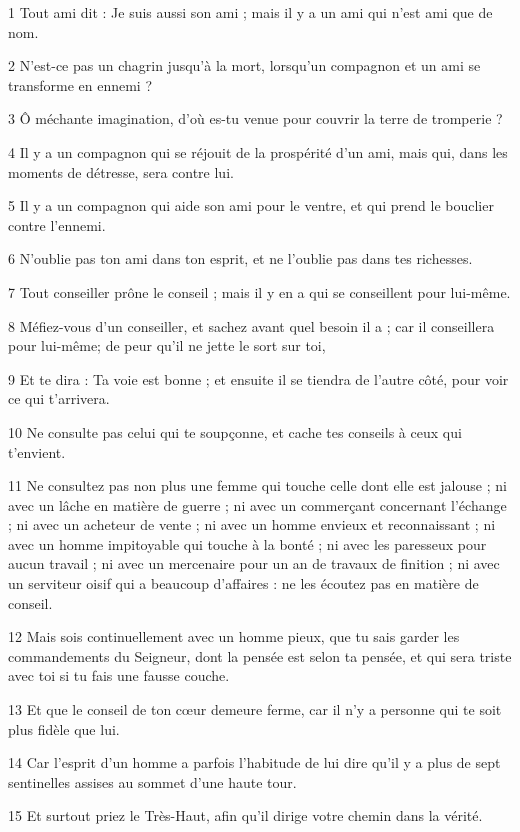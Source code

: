 \par 1 Tout ami dit : Je suis aussi son ami ; mais il y a un ami qui n'est ami que de nom.
\par 2 N'est-ce pas un chagrin jusqu'à la mort, lorsqu'un compagnon et un ami se transforme en ennemi ?
\par 3 Ô méchante imagination, d'où es-tu venue pour couvrir la terre de tromperie ?
\par 4 Il y a un compagnon qui se réjouit de la prospérité d'un ami, mais qui, dans les moments de détresse, sera contre lui.
\par 5 Il y a un compagnon qui aide son ami pour le ventre, et qui prend le bouclier contre l'ennemi.
\par 6 N'oublie pas ton ami dans ton esprit, et ne l'oublie pas dans tes richesses.
\par 7 Tout conseiller prône le conseil ; mais il y en a qui se conseillent pour lui-même.
\par 8 Méfiez-vous d'un conseiller, et sachez avant quel besoin il a ; car il conseillera pour lui-même; de peur qu'il ne jette le sort sur toi,
\par 9 Et te dira : Ta voie est bonne ; et ensuite il se tiendra de l'autre côté, pour voir ce qui t'arrivera.
\par 10 Ne consulte pas celui qui te soupçonne, et cache tes conseils à ceux qui t'envient.
\par 11 Ne consultez pas non plus une femme qui touche celle dont elle est jalouse ; ni avec un lâche en matière de guerre ; ni avec un commerçant concernant l'échange ; ni avec un acheteur de vente ; ni avec un homme envieux et reconnaissant ; ni avec un homme impitoyable qui touche à la bonté ; ni avec les paresseux pour aucun travail ; ni avec un mercenaire pour un an de travaux de finition ; ni avec un serviteur oisif qui a beaucoup d'affaires : ne les écoutez pas en matière de conseil.
\par 12 Mais sois continuellement avec un homme pieux, que tu sais garder les commandements du Seigneur, dont la pensée est selon ta pensée, et qui sera triste avec toi si tu fais une fausse couche.
\par 13 Et que le conseil de ton cœur demeure ferme, car il n'y a personne qui te soit plus fidèle que lui.
\par 14 Car l'esprit d'un homme a parfois l'habitude de lui dire qu'il y a plus de sept sentinelles assises au sommet d'une haute tour.
\par 15 Et surtout priez le Très-Haut, afin qu'il dirige votre chemin dans la vérité.
